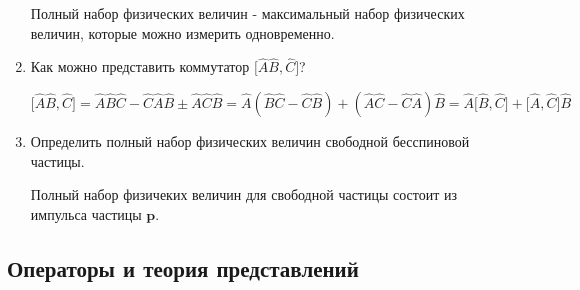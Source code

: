 \documentclass{article}
\begin{document}
\begin{enumerate}
	Полный набор физических величин - максимальный набор физических величин, которые можно измерить одновременно.
	
	\item {Как можно представить коммутатор $\Big[ \hat{A} \hat{B}, \hat{C}\Big]$?}
	
	\begin{equation}
		\Big[ \hat{A} \hat{B}, \hat{C}\Big] = \hat{A}\hat{B}\hat{C} - \hat{C}\hat{A}\hat{B} \pm \hat{A} \hat{C} \hat{B} = \hat{A}(\hat{B}\hat{C} - \hat{C} \hat{B}) + (\hat{A}\hat{C} - \hat{C} \hat{A}) \hat{B} = \hat{A}\Big[ \hat{B}, \hat{C}\Big] + \Big[ \hat{A}, \hat{C}\Big] \hat{B} \label{abc}
	\end{equation}
	
	\item {Определить полный набор физических величин свободной бесспиновой частицы.}
	
	Полный набор физичеких величин для свободной частицы состоит из импульса частицы $\textbf{p}$.

\end{enumerate}

\subsection*{Операторы и теория представлений}
\end{document}
